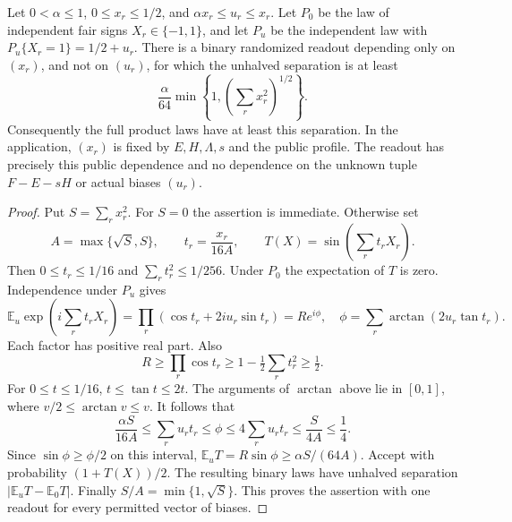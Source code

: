 \begin{lemma}\label{lem:unequalsignals89}
Let $0<\alpha\le1$, $0\le x_r\le1/2$, and
$\alpha x_r\le u_r\le x_r$.  Let $P_0$ be the law of independent
fair signs $X_r\in\{-1,1\}$, and let $P_u$ be the independent law
with $P_u\{X_r=1\}=1/2+u_r$.  There is a binary randomized readout
depending only on $(x_r)$, and not on $(u_r)$, for which the unhalved
separation is at least
\begin{equation}\label{eq:unequalsignals89}
 \frac{\alpha}{64}\min\left\{1,
                         \left(\sum_r x_r^2\right)^{1/2}\right\}.
\end{equation}
Consequently the full product laws have at least this separation.
In the application, $(x_r)$ is fixed by $E,H,\Lambda,s$ and the public
profile.  The readout has precisely this public dependence and no
dependence on the unknown tuple $F-E-sH$ or actual biases $(u_r)$.
\end{lemma}
\begin{proof}
Put $S=\sum_r x_r^2$.  For $S=0$ the assertion is immediate.
Otherwise set
\[
 A=\max\{\sqrt S,S\},\qquad
 t_r=\frac{x_r}{16A},\qquad
 T(X)=\sin\left(\sum_r t_rX_r\right).
\]
Then $0\le t_r\le1/16$ and $\sum_r t_r^2\le1/256$.
Under $P_0$ the expectation of $T$ is zero.  Independence under $P_u$
gives
\[
 \mathbb E_u\exp\left(i\sum_r t_rX_r\right)
 =\prod_r(\cos t_r+2iu_r\sin t_r)=R e^{i\phi},
 \quad \phi=\sum_r\arctan(2u_r\tan t_r).
\]
Each factor has positive real part.  Also
\[
 R\ge\prod_r\cos t_r
 \ge1-\tfrac12\sum_r t_r^2\ge\tfrac12.
\]
For $0\le t\le1/16$, $t\le\tan t\le2t$.  The arguments of
$\arctan$ above lie in $[0,1]$, where $v/2\le\arctan v\le v$.
It follows that
\[
 \frac{\alpha S}{16A}\le\sum_r u_rt_r\le\phi
 \le4\sum_r u_rt_r\le\frac{S}{4A}\le\frac14.
\]
Since $\sin\phi\ge\phi/2$ on this interval,
$\mathbb E_uT=R\sin\phi\ge\alpha S/(64A)$.
Accept with probability $(1+T(X))/2$.  The resulting binary laws
have unhalved separation $|\mathbb E_uT-\mathbb E_0T|$.
Finally $S/A=\min\{1,\sqrt S\}$.  This proves the assertion with
one readout for every permitted vector of biases.
\end{proof}

